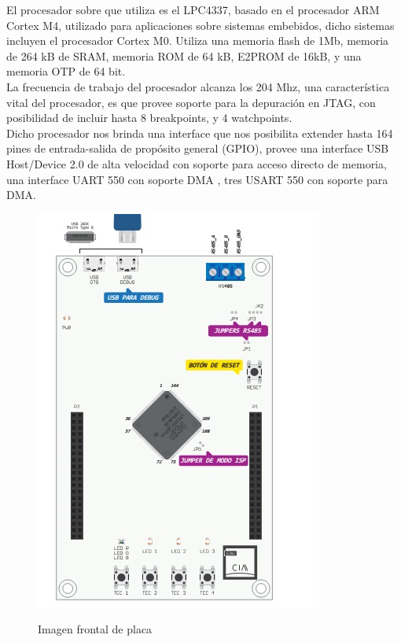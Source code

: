 \documentclass[12pt,letterpaper]{article}
\begin{document}
El procesador sobre que utiliza es el LPC4337, basado en el procesador ARM Cortex M4, utilizado para aplicaciones sobre sistemas embebidos, dicho sistemas incluyen el procesador Cortex M0. Utiliza una memoria flash de 1Mb, memoria de 264 kB de SRAM, memoria ROM de 64 kB, E2PROM de 16kB, y una memoria OTP de 64 bit.\\
La frecuencia de trabajo del procesador alcanza los 204 Mhz, una característica vital del procesador, es que provee soporte para la depuración en JTAG, con posibilidad de incluir hasta 8 breakpoints, y 4 watchpoints.\\
Dicho procesador nos brinda una interface que nos posibilita extender hasta 164 pines de entrada-salida de propósito general (GPIO), provee una interface USB Host/Device 2.0 de alta velocidad con soporte para acceso directo de memoria, una interface UART 550 con soporte DMA , tres USART 550 con soporte para DMA.\\


\begin{figure}[!h]
\centering
\includegraphics[width=8 cm]{figuras/FIGURA_1.jpg}\\
\caption{Imagen frontal de placa}
\label{Fig2}
\end{figure}
\end{document}
